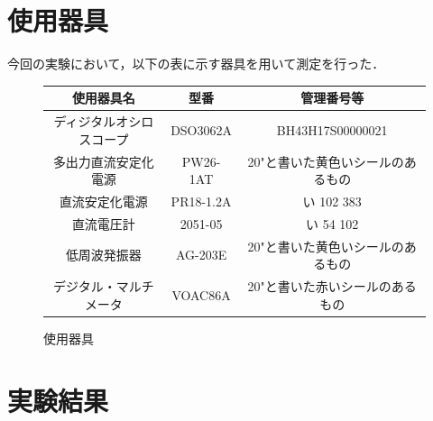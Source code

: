 \documentclass[10pt, a4j, dvipdfmx]{jarticle}
\makeatletter
\newcommand{\tblcaption}[1]{\def\@captype{table}\caption{#1}}
\makeatother
\begin{document}
\section{使用器具}
今回の実験において，以下の表に示す器具を用いて測定を行った．
\begin{figure}[H]
	\centering
	\tblcaption{使用器具}
	\label{tbl:使用器具}
	\begin{tabular}{|c|c|c|}\hline
		使用器具名 & 型番 & 管理番号等 \\\hline
		ディジタルオシロスコープ & DSO3062A & BH43H17S00000021 \\\hline
		多出力直流安定化電源 & PW26-1AT & 20"と書いた黄色いシールのあるもの \\\hline
		直流安定化電源 & PR18-1.2A & い 102 383 \\\hline
		直流電圧計 & 2051-05 & い 54 102 \\\hline
		低周波発振器 & AG-203E & 20"と書いた黄色いシールのあるもの \\\hline
		デジタル・マルチメータ & VOAC86A & 20"と書いた赤いシールのあるもの \\\hline
	\end{tabular}
\end{figure}

\newpage
\section{実験結果}
\end{document}

